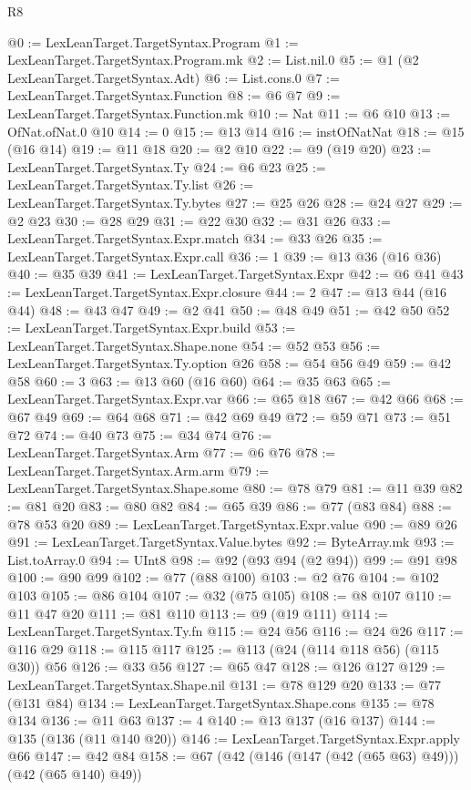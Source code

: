 \begin{lexlean}{R8}
\begin{coremodule}
{{{{{{{{{{{{{{{{{@0 := LexLeanTarget.TargetSyntax.Program
@1 := LexLeanTarget.TargetSyntax.Program.mk
@2 := List.nil.{0}
@5 := @1 (@2 LexLeanTarget.TargetSyntax.Adt)
@6 := List.cons.{0}
@7 := LexLeanTarget.TargetSyntax.Function
@8 := @6 @7
@9 := LexLeanTarget.TargetSyntax.Function.mk
@10 := Nat
@11 := @6 @10
@13 := OfNat.ofNat.{0} @10
@14 := 0
@15 := @13 @14
@16 := instOfNatNat
@18 := @15 (@16 @14)
@19 := @11 @18
@20 := @2 @10
@22 := @9 (@19 @20)
@23 := LexLeanTarget.TargetSyntax.Ty
@24 := @6 @23
@25 := LexLeanTarget.TargetSyntax.Ty.list
@26 := LexLeanTarget.TargetSyntax.Ty.bytes
@27 := @25 @26
@28 := @24 @27
@29 := @2 @23
@30 := @28 @29
@31 := @22 @30
@32 := @31 @26
@33 := LexLeanTarget.TargetSyntax.Expr.match
@34 := @33 @26
@35 := LexLeanTarget.TargetSyntax.Expr.call
@36 := 1
@39 := @13 @36 (@16 @36)
@40 := @35 @39
@41 := LexLeanTarget.TargetSyntax.Expr
@42 := @6 @41
@43 := LexLeanTarget.TargetSyntax.Expr.closure
@44 := 2
@47 := @13 @44 (@16 @44)
@48 := @43 @47
@49 := @2 @41
@50 := @48 @49
@51 := @42 @50
@52 := LexLeanTarget.TargetSyntax.Expr.build
@53 := LexLeanTarget.TargetSyntax.Shape.none
@54 := @52 @53
@56 := LexLeanTarget.TargetSyntax.Ty.option @26
@58 := @54 @56 @49
@59 := @42 @58
@60 := 3
@63 := @13 @60 (@16 @60)
@64 := @35 @63
@65 := LexLeanTarget.TargetSyntax.Expr.var
@66 := @65 @18
@67 := @42 @66
@68 := @67 @49
@69 := @64 @68
@71 := @42 @69 @49
@72 := @59 @71
@73 := @51 @72
@74 := @40 @73
@75 := @34 @74
@76 := LexLeanTarget.TargetSyntax.Arm
@77 := @6 @76
@78 := LexLeanTarget.TargetSyntax.Arm.arm
@79 := LexLeanTarget.TargetSyntax.Shape.some
@80 := @78 @79
@81 := @11 @39
@82 := @81 @20
@83 := @80 @82
@84 := @65 @39
@86 := @77 (@83 @84)
@88 := @78 @53 @20
@89 := LexLeanTarget.TargetSyntax.Expr.value
@90 := @89 @26
@91 := LexLeanTarget.TargetSyntax.Value.bytes
@92 := ByteArray.mk
@93 := List.toArray.{0}
@94 := UInt8
@98 := @92 (@93 @94 (@2 @94))
@99 := @91 @98
@100 := @90 @99
@102 := @77 (@88 @100)
@103 := @2 @76
@104 := @102 @103
@105 := @86 @104
@107 := @32 (@75 @105)
@108 := @8 @107
@110 := @11 @47 @20
@111 := @81 @110
@113 := @9 (@19 @111)
@114 := LexLeanTarget.TargetSyntax.Ty.fn
@115 := @24 @56
@116 := @24 @26
@117 := @116 @29
@118 := @115 @117
@125 := @113 (@24 (@114 @118 @56) (@115 @30)) @56
@126 := @33 @56
@127 := @65 @47
@128 := @126 @127
@129 := LexLeanTarget.TargetSyntax.Shape.nil
@131 := @78 @129 @20
@133 := @77 (@131 @84)
@134 := LexLeanTarget.TargetSyntax.Shape.cons
@135 := @78 @134
@136 := @11 @63
@137 := 4
@140 := @13 @137 (@16 @137)
@144 := @135 (@136 (@11 @140 @20))
@146 := LexLeanTarget.TargetSyntax.Expr.apply @66
@147 := @42 @84
@158 := @67 (@42 (@146 (@147 (@42 (@65 @63) @49))) (@42 (@65 @140) @49))
}}}}}}}}}}}}}}}}}
\end{coremodule}
\end{lexlean}
